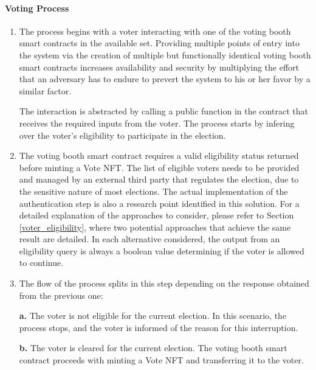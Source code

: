 \documentclass[../main.tex]{subfiles}
\begin{document}
        \paragraph{Voting Process}
            \begin{enumerate}
                \item{The process begins with a voter interacting with one of the voting booth smart contracts in the available set. Providing multiple points of entry into the system via the creation of multiple but functionally identical voting booth smart contracts increases availability and security by multiplying the effort that an adversary has to endure to prevert the system to his or her favor by a similar factor.
                \par
                The interaction is abstracted by calling a public function in the contract that receives the required inputs from the voter. The process starts by infering over the voter's eligibility to participate in the election.}

                \item{The voting booth smart contract requires a valid eligibility status returned before minting a Vote NFT. The list of eligible voters needs to be provided and managed by an external third party that regulates the election, due to the sensitive nature of most elections. The actual implementation of the authentication step is also a research point identified in this solution. For a detailed explanation of the approaches to consider, please refer to Section \ref{voter_eligibility}, where two potential approaches that achieve the same result are detailed. In each alternative considered, the output from an eligibility query is always a boolean value determining if the voter is allowed to continue.}

                \item{The flow of the process splits in this step depending on the response obtained from the previous one:
                    \par
                    \textbf{a.} The voter is not eligible for the current election. In this scenario, the process stops, and the voter is informed of the reason for this interruption.
                    \par
                    \textbf{b.} The voter is cleared for the current election. The voting booth smart contract proceeds with minting a Vote NFT and transferring it to the voter.}


\end{enumerate}
\end{document}
